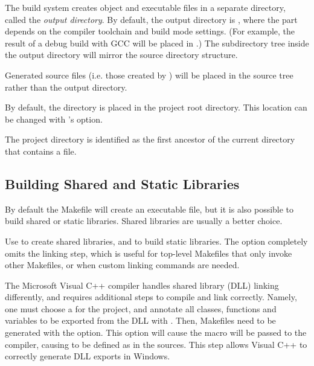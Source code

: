 The build system creates object and executable files in a separate directory, called the
\textit{output directory}. By default, the output directory is ,
where the  part depends on the compiler toolchain and build mode settings.
(For example, the result of a debug build with GCC will be placed in .)
The subdirectory tree inside the output directory will mirror the source directory
structure.

\begin{note}
Generated source files (i.e. those created by ) will be placed in the
source tree rather than the output directory.
\end{note}

By default, the  directory is placed in the project root directory. This location
can be changed with 's  option.


\begin{note}
The project directory is identified as the first ancestor of the current directory
that contains a  file.
\end{note}


\subsection{Building Shared and Static Libraries}
\label{sec:build-sim-progs:building-shared-and-static-libraries}

By default the Makefile will create an executable file, but it is also
possible to build shared or static libraries. Shared libraries
are usually a better choice.

Use  to create shared libraries, and 
to build static libraries. The  option completely omits
the linking step, which is useful for top-level Makefiles that only invoke
other Makefiles, or when custom linking commands are needed.

\ifcommercial
\begin{note}
The Microsoft Visual C++ compiler handles shared library (DLL) linking
differently, and requires additional steps to compile and link correctly.
Namely, one must choose a  for the project, and annotate all classes,
functions and variables to be exported from the DLL with .
Then, Makefiles need to be generated with the  option.
This option will cause the  macro will be passed to
the compiler, causing  to be defined as  in
the sources. This step allows Visual C++ to correctly generate DLL exports in Windows.
\end{note}


